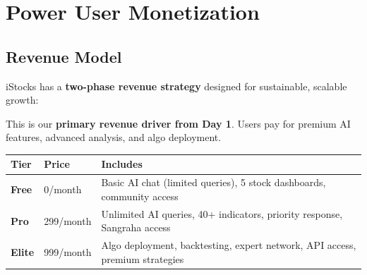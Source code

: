 \documentclass[11pt,a4paper]{article}
\newcommand{\rupee}{\text{\textrupee}}
\begin{document}
\begin{center}
\end{center}

\newpage

\section{Power User Monetization}

\subsection{Revenue Model}

iStocks has a \textbf{two-phase revenue strategy} designed for sustainable, scalable growth:

\begin{highlightbox}
This is our \textbf{primary revenue driver from Day 1}. Users pay for premium AI features, advanced analysis, and algo deployment.

\begin{tabularx}{\textwidth}{>{\bfseries}p{2.5cm}p{3.5cm}X}
\toprule
\textbf{Tier} & \textbf{Price} & \textbf{Includes} \\
\midrule
Free & \rupee0/month & Basic AI chat (limited queries), 5 stock dashboards, community access \\
\addlinespace
Pro & \rupee299/month & Unlimited AI queries, 40+ indicators, priority response, Sangraha access \\
\addlinespace
Elite & \rupee999/month & Algo deployment, backtesting, expert network, API access, premium strategies \\
\bottomrule
\end{tabularx}
\end{highlightbox}
\end{document}
